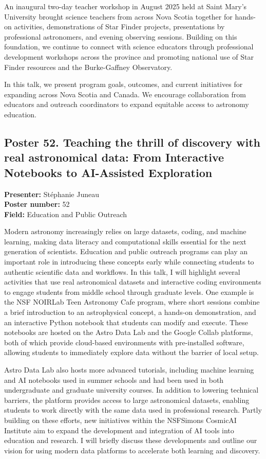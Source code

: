 An inaugural two-day teacher workshop in August 2025 held at Saint Mary's University brought science teachers from across Nova Scotia together for hands-on activities, demonstrations of Star Finder projects, presentations by professional astronomers, and evening observing sessions. Building on this foundation, we continue to connect with science educators through professional development workshops across the province and promoting national use of Star Finder resources and the Burke-Gaffney Observatory.

In this talk, we present program goals, outcomes, and current initiatives for expanding across Nova Scotia and Canada. We encourage collaboration from educators and outreach coordinators to expand equitable access to astronomy education.

\hypertarget{poster-abstract-talk-334}{}\label{poster-abstract-page-talk-334}
\subsection*{Poster 52. Teaching the thrill of discovery with real astronomical data: From Interactive Notebooks to AI-Assisted Exploration}
\textbf{Presenter:} Stéphanie Juneau\\
\textbf{Poster number:} 52\\
\textbf{Field:} Education and Public Outreach

Modern astronomy increasingly relies on large datasets, coding, and machine learning, making data literacy and computational skills essential for the next generation of scientists. Education and public outreach programs can play an important role in introducing these concepts early while connecting students to authentic scientific data and workflows. In this talk, I will highlight several activities that use real astronomical datasets and interactive coding environments to engage students from middle school through graduate levels. One example is the NSF NOIRLab Teen Astronomy Cafe program, where short sessions combine a brief introduction to an astrophysical concept, a hands-on demonstration, and an interactive Python notebook that students can modify and execute. These notebooks are hosted on the Astro Data Lab and the Google Collab platforms, both of which provide cloud-based environments with pre-installed software, allowing students to immediately explore data without the barrier of local setup.

Astro Data Lab also hosts more advanced tutorials, including machine learning and AI notebooks used in summer schools and had been used in both undergraduate and graduate university courses. In addition to lowering technical barriers, the platform provides access to large astronomical datasets, enabling students to work directly with the same data used in professional research. Partly building on these efforts, new initiatives within the NSFSimons CosmicAI Institute aim to expand the development and integration of AI tools into education and research. I will briefly discuss these developments and outline our vision for using modern data platforms to accelerate both learning and discovery.

